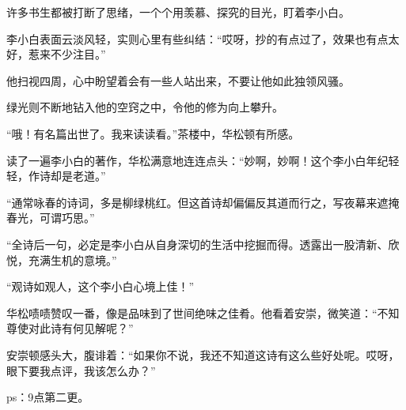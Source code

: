 \begin{this_body}
许多书生都被打断了思绪，一个个用羡慕、探究的目光，盯着李小白。

李小白表面云淡风轻，实则心里有些纠结：“哎呀，抄的有点过了，效果也有点太好，惹来不少注目。”

他扫视四周，心中盼望着会有一些人站出来，不要让他如此独领风骚。

绿光则不断地钻入他的空窍之中，令他的修为向上攀升。

“哦！有名篇出世了。我来读读看。”茶楼中，华松顿有所感。

读了一遍李小白的著作，华松满意地连连点头：“妙啊，妙啊！这个李小白年纪轻轻，作诗却是老道。”

“通常咏春的诗词，多是柳绿桃红。但这首诗却偏偏反其道而行之，写夜幕来遮掩春光，可谓巧思。”

“全诗后一句，必定是李小白从自身深切的生活中挖掘而得。透露出一股清新、欣悦，充满生机的意境。”

“观诗如观人，这个李小白心境上佳！”

华松啧啧赞叹一番，像是品味到了世间绝味之佳肴。他看着安崇，微笑道：“不知尊使对此诗有何见解呢？”

安崇顿感头大，腹诽着：“如果你不说，我还不知道这诗有这么些好处呢。哎呀，眼下要我点评，我该怎么办？”

ps：9点第二更。

\end{this_body}

